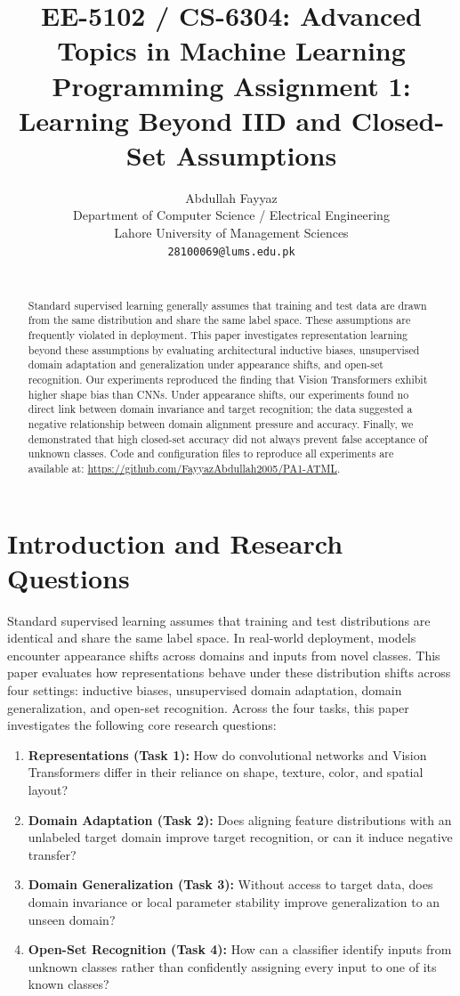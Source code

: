 \documentclass{article}
\title{EE-5102 / CS-6304: Advanced Topics in Machine Learning\\Programming Assignment 1: Learning Beyond IID and Closed-Set Assumptions}
\author{%
Abdullah Fayyaz \\
Department of Computer Science / Electrical Engineering \\
Lahore University of Management Sciences \\
\texttt{28100069@lums.edu.pk} \\
\vspace{1mm} \\
}
\begin{document}
\maketitle

\begin{abstract}
Standard supervised learning generally assumes that training and test data are drawn from the same distribution and share the same label space. These assumptions are frequently violated in deployment. This paper investigates representation learning beyond these assumptions by evaluating architectural inductive biases, unsupervised domain adaptation and generalization under appearance shifts, and open-set recognition. Our experiments reproduced the finding that Vision Transformers exhibit higher shape bias than CNNs. Under appearance shifts, our experiments found no direct link between domain invariance and target recognition; the data suggested a negative relationship between domain alignment pressure and accuracy. Finally, we demonstrated that high closed-set accuracy did not always prevent false acceptance of unknown classes. Code and configuration files to reproduce all experiments are available at: \url{https://github.com/FayyazAbdullah2005/PA1-ATML}.
\end{abstract}

\section{Introduction and Research Questions}
\label{sec:introduction}

Standard supervised learning assumes that training and test distributions are identical and share the same label space. In real-world deployment, models encounter appearance shifts across domains and inputs from novel classes. This paper evaluates how representations behave under these distribution shifts across four settings: inductive biases, unsupervised domain adaptation, domain generalization, and open-set recognition. Across the four tasks, this paper investigates the following core research questions:
\begin{enumerate}
    \item \textbf{Representations (Task 1):} How do convolutional networks and Vision Transformers differ in their reliance on shape, texture, color, and spatial layout?
    \item \textbf{Domain Adaptation (Task 2):} Does aligning feature distributions with an unlabeled target domain improve target recognition, or can it induce negative transfer?
    \item \textbf{Domain Generalization (Task 3):} Without access to target data, does domain invariance or local parameter stability improve generalization to an unseen domain?
    \item \textbf{Open-Set Recognition (Task 4):} How can a classifier identify inputs from unknown classes rather than confidently assigning every input to one of its known classes?
\end{enumerate}
\end{document}
